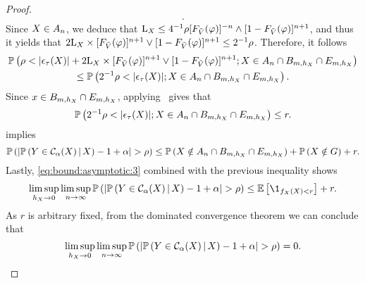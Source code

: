 \begin{proof}
\begin{multline*}
    .
  \end{multline*}
  Since $X \in A_{n}$, we deduce that $\mathrm{L}_{X}\le 4^{-1}\rho [{F_{\tilde{V}}(\varphi)}]^{-n} \wedge [{1 - F_{\tilde{V}}(\varphi)}]^{n+1}$, and thus it yields that $2 \mathrm{L}_{X} \times [{F_{\tilde{V}}(\varphi)}]^{n+1} \vee [{1 - F_{\tilde{V}}(\varphi)}]^{n+1} \le 2^{-1} \rho$.
  Therefore, it follows
  \begin{multline*}
    \mathbb{P}\left({
      \rho
      < |{\epsilon_{\tau}(X)}| + 2 \mathrm{L}_{X} \times [{F_{\tilde{V}}(\varphi)}]^{n+1} \vee [{1 - F_{\tilde{V}}(\varphi)}]^{n+1}; X \in A_{n} \cap B_{m,h_{X}} \cap E_{m,h_{X}}
    }\right)
    \\
    \le \mathbb{P}\left({
      2^{-1} \rho
      < |{\epsilon_{\tau}(X)}|; X \in A_{n} \cap B_{m,h_{X}} \cap E_{m,h_{X}}
    }\right).
  \end{multline*}
  Since $x\in B_{m,h_{X}} \cap E_{m,h_{X}}$, applying~ gives that
  \begin{equation*}
    \mathbb{P}\left({
      2^{-1} \rho
      < |{\epsilon_{\tau}(X)}|; X \in A_{n} \cap B_{m,h_{X}} \cap E_{m,h_{X}}
    }\right)
    \le r.
  \end{equation*}
   implies
  \begin{equation*}
    \mathbb{P}\left({
      \left\lvert{ \mathbb{P}\left({Y\in \mathcal{C}_{\alpha}(X) \,\vert\, X}\right) - 1 + \alpha }\right\rvert
      > \rho
    }\right)
    \le \mathbb{P}\left({ X \notin A_{n} \cap B_{m,h_{X}} \cap E_{m,h_{X}} }\right)
    + \mathbb{P}\left({ X \notin G }\right)
    + r
    .
  \end{equation*}
  Lastly, \eqref{eq:bound:asymptotic:3} combined with the previous inequality shows
  \begin{equation*}
    \limsup_{h_{X}\to 0}\limsup_{\tcount\to \infty} \prob\pr{
      \abs{ \prob\pr{Y\in \mathcal{C}_{\alpha}(X) \,\vert\, X} - 1 + \alpha }
      > \rho
    }
    \le \E\br{\1_{f_X(X) < r}} + r
    .
  \end{equation*}
  As $r$ is arbitrary fixed, from the dominated convergence theorem we can conclude that 
  \begin{equation*}
    \limsup_{h_{X}\to 0}\limsup_{n\to \infty} \mathbb{P}\left({
      \left\lvert{ \mathbb{P}\left({Y\in \mathcal{C}_{\alpha}(X) \,\vert\, X}\right) - 1 + \alpha }\right\rvert
      > \rho
    }\right)
    = 0
    .
  \end{equation*}
\end{proof}
